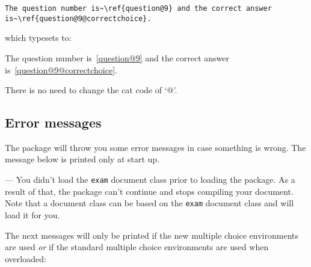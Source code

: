 \documentclass[12pt,a4paper]{exam}
\begin{document}
\begin{lstlisting}
The question number is~\ref{question@9} and the correct answer
is~\ref{question@9@correctchoice}.
\end{lstlisting}

which typesets to:

The question number is~\ref{question@9} and the correct answer
is~\ref{question@9@correctchoice}.

There is no need to change the cat code of `@'.

\subsection{Error messages}
The package will throw you some error messages in case something is wrong. The
message below is printed only at start up.

\begin{description}[labelindent=2ex]
\item[\texttt{The exam class is not loaded. Emergency stop!}] --- You didn't load
the \texttt{exam} document class prior to loading the package. As a result of that,
the package can't continue and stops compiling your document. Note that a document
class can be based on the \texttt{exam} document class and will load it for you.

\end{description}

The next messages will only be printed if the new multiple choice environments
are used \emph{or} if the standard multiple choice environments are used when
overloaded: 
\end{document}
